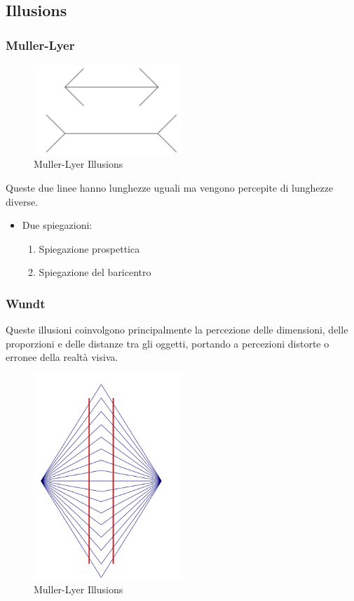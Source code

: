   \subsection{Illusions}
  \subsubsection{Muller-Lyer}
  \begin{figure}[H]
    \centering
    \includegraphics[width=0.5\textwidth]{images/Muller.png} 
    \caption{Muller-Lyer Illusions}
    \label{fig:immagine}
\end{figure}
  Queste due linee hanno lunghezze uguali ma vengono percepite di lunghezze diverse.
    \begin{itemize}
        \item Due spiegazioni:
        \begin{enumerate}
            \item Spiegazione prospettica
            \item Spiegazione del baricentro
        \end{enumerate}
    \end{itemize}
  \subsubsection{Wundt}
  Queste illusioni coinvolgono principalmente la percezione delle dimensioni, delle proporzioni e delle distanze tra gli oggetti, portando
   a percezioni distorte o erronee della realtà visiva.
   \begin{figure}[H]
    \centering
    \includegraphics[width=0.5\textwidth]{images/Wundt.png} 
    \caption{Muller-Lyer Illusions}
    \label{fig:immagine}
\end{figure}

